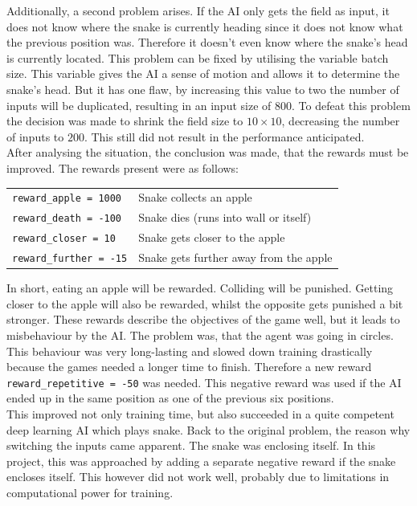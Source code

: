 \documentclass[12pt]{article}
\begin{document}
Additionally, a second problem arises. If the AI only gets the field as input, it does not know where the snake is currently heading since it does not know what the previous position was. Therefore it doesn't even know where the snake's head is currently located. This problem can be fixed by utilising the variable \gls{batch size}. This variable gives the AI a sense of motion and allows it to determine the snake's head. But it has one flaw, by increasing this value to two the number of inputs will be duplicated, resulting in an input size of $800$. To defeat this problem the decision was made to shrink the field size to $10{\times}10$, decreasing the number of inputs to $200$. This still did not result in the performance anticipated.\\ 
After analysing the situation, the conclusion was made, that the rewards must be improved. The rewards present were as follows:
\begin{table}[ht]
\begin{tabularx}{\textwidth}{lX}
\lstinline{reward_apple = 1000} & Snake collects an apple\\
\lstinline{reward_death = -100} & Snake dies (runs into wall or itself)\\
\lstinline{reward_closer = 10} & Snake gets closer to the apple\\
\lstinline{reward_further = -15} & Snake gets further away from the apple\\
\end{tabularx}
\end{table}
In short, eating an apple will be rewarded. Colliding will be punished. Getting closer to the apple will also be rewarded, whilst the opposite gets punished a bit stronger. These rewards describe the objectives of the game well, but it leads to misbehaviour by the AI. The problem was, that the agent was going in circles. This behaviour was very long-lasting and slowed down training drastically because the games needed a longer time to finish. Therefore a new reward \lstinline{reward_repetitive = -50} was needed. This negative reward was used if the AI ended up in the same position as one of the previous six positions. \\
This improved not only training time, but also succeeded in a quite competent deep learning AI which plays snake. Back to the original problem, the reason why switching the inputs came apparent. The snake was enclosing itself. In this project, this was approached by adding a separate negative reward if the snake encloses itself. This however did not work well, probably due to limitations in computational power for training.
\end{document}
